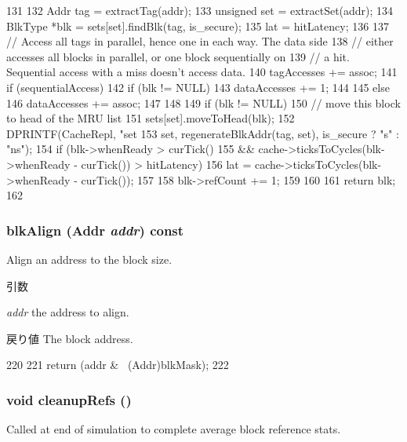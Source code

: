 \begin{DoxyCode}
131 {
132     Addr tag = extractTag(addr);
133     unsigned set = extractSet(addr);
134     BlkType *blk = sets[set].findBlk(tag, is_secure);
135     lat = hitLatency;
136 
137     // Access all tags in parallel, hence one in each way.  The data side
138     // either accesses all blocks in parallel, or one block sequentially on
139     // a hit.  Sequential access with a miss doesn't access data.
140     tagAccesses += assoc;
141     if (sequentialAccess) {
142         if (blk != NULL) {
143             dataAccesses += 1;
144         }
145     } else {
146         dataAccesses += assoc;
147     }
148 
149     if (blk != NULL) {
150         // move this block to head of the MRU list
151         sets[set].moveToHead(blk);
152         DPRINTF(CacheRepl, "set %
153                 set, regenerateBlkAddr(tag, set), is_secure ? "s" : "ns");
154         if (blk->whenReady > curTick()
155             && cache->ticksToCycles(blk->whenReady - curTick()) > hitLatency) {
156             lat = cache->ticksToCycles(blk->whenReady - curTick());
157         }
158         blk->refCount += 1;
159     }
160 
161     return blk;
162 }
\end{DoxyCode}
\hypertarget{classLRU_a73119e914b3b83f88be5bde312855cfe}{
\subsubsection[{blkAlign}]{ blkAlign ({\bf Addr} {\em addr}) const}}
\label{classLRU_a73119e914b3b83f88be5bde312855cfe}
Align an address to the block size. 
\begin{DoxyParams}{引数}
\item[{\em addr}]the address to align. \end{DoxyParams}
\begin{DoxyReturn}{戻り値}
The block address. 
\end{DoxyReturn}



\begin{DoxyCode}
220     {
221         return (addr & ~(Addr)blkMask);
222     }
\end{DoxyCode}
\hypertarget{classLRU_a1acd4c03e94e57919f1254cc4fa0b059}{
\subsubsection[{cleanupRefs}]{\setlength{\rightskip}{0pt plus 5cm}void cleanupRefs ()}}
\label{classLRU_a1acd4c03e94e57919f1254cc4fa0b059}
Called at end of simulation to complete average block reference stats. 

